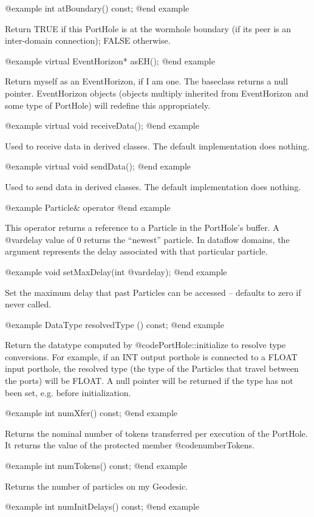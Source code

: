 @example
int atBoundary() const;
@end example

Return TRUE if this PortHole is at the wormhole boundary (if its peer is
an inter-domain connection); FALSE otherwise.

@example
virtual EventHorizon* asEH();
@end example

Return myself as an EventHorizon, if I am one.  The baseclass returns
a null pointer.  EventHorizon objects (objects multiply inherited from
EventHorizon and some type of PortHole) will redefine this
appropriately.

@example
virtual void receiveData();
@end example

Used to receive data in derived classes.  The default implementation
does nothing.

@example
virtual void sendData();
@end example

Used to send data in derived classes.  The default implementation
does nothing.

@example
Particle& operator %
@end example

This operator returns a reference to a Particle in the PortHole's
buffer.  A @var{delay} value of 0 returns the ``newest'' particle.
In dataflow domains, the argument represents the delay associated
with that particular particle.

@example
void setMaxDelay(int @var{delay});
@end example

Set the maximum delay that past Particles can be accessed -- defaults to
zero if never called.

@example
DataType resolvedType () const;
@end example

Return the datatype computed by @code{PortHole::initialize} to resolve
type conversions.  For example, if an INT output porthole is connected
to a FLOAT input porthole, the resolved type (the type of the Particles
that travel between the ports) will be FLOAT.  A null pointer will be
returned if the type has not been set, e.g. before initialization.

@example
int numXfer() const;
@end example

Returns the nominal number of tokens transferred per execution of the
PortHole.  It returns the value of the protected member @code{numberTokens}.

@example
int numTokens() const;
@end example

Returns the number of particles on my Geodesic.

@example
int numInitDelays() const;
@end example

